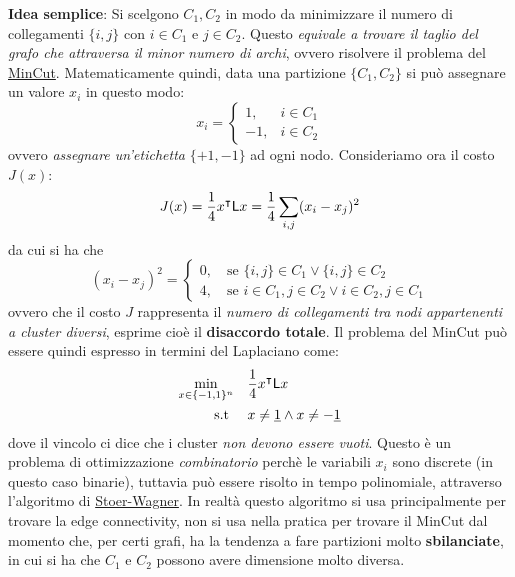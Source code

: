 \textbf{Idea semplice}: Si scelgono $C_1, C_2$ in modo da minimizzare il numero di collegamenti $\{i, j\}$ con $i\in C_1$ e $j \in C_2$. Questo \textit{equivale a trovare il taglio del grafo che attraversa il minor numero di archi}, ovvero risolvere il problema del \href{https://en.wikipedia.org/wiki/Minimum_cut}{MinCut}. Matematicamente quindi, data una partizione $\{C_1, C_2\}$ si pu\`o assegnare un valore $x_i$ in questo modo:
\begin{equation}
x_i = \begin{cases}
1, & i \in C_1 \\
-1, & i \in C_2
\end{cases}
\end{equation}
ovvero \textit{assegnare un'etichetta} $\{+1, -1\}$ ad ogni nodo. 
Consideriamo ora il costo $J(x)$:
\begin{equation}
J(x) = \frac{1}{4} x^\intercal \mathsf{L} x = \frac{1}{4} \sum_{i,j} (x_i - x_j)^2
\end{equation}
da cui si ha che
\begin{equation}
(x_i - x_j)^2 = \begin{cases}
0, \quad \text{se } \{i,j\} \in C_1 \lor \{i,j\} \in C_2 \\
4, \quad \text{se } i \in C_1, j\in C_2 \lor i \in C_2, j \in C_1
\end{cases}
\end{equation}
ovvero che il costo $J$ rappresenta il \textit{numero di collegamenti tra nodi appartenenti a cluster diversi}, esprime cio\`e il \textbf{disaccordo totale}. Il problema del MinCut pu\`o essere quindi espresso in termini del Laplaciano come:
\begin{align*}
\min_{x \in \{-1, 1\}^n} \quad &\frac{1}{4} x^\intercal \mathsf{L} x \\
\text{s.t } \quad &x \neq \underline{1} \land x \neq -\underline{1}
\end{align*}
dove il vincolo ci dice che i cluster \textit{non devono essere vuoti}. Questo \`e un problema di ottimizzazione \textit{combinatorio} perch\`e le variabili $x_i$ sono discrete (in questo caso binarie), tuttavia pu\`o essere risolto in tempo polinomiale, attraverso l'algoritmo di \href{https://en.wikipedia.org/wiki/Stoer-Wagner_algorithm}{Stoer-Wagner}. In realt\`a questo algoritmo si usa principalmente per trovare la edge connectivity, non si usa nella pratica per trovare il MinCut dal momento che, per certi grafi, ha la tendenza a fare partizioni molto \textbf{sbilanciate}, in cui si ha che $C_1$ e $C_2$ possono avere dimensione molto diversa.

